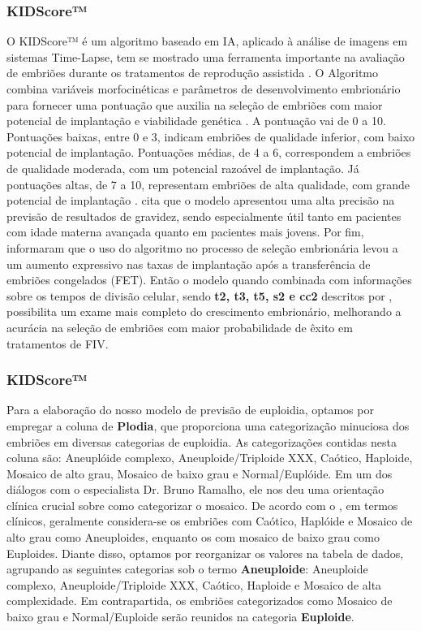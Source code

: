 \subsubsection{KIDScore™}
O KIDScore™ é um algoritmo baseado em IA, aplicado à análise de imagens em sistemas Time-Lapse, tem se mostrado uma ferramenta importante na avaliação de embriões durante os tratamentos de reprodução assistida \cite{kato2021}. O Algoritmo combina variáveis morfocinéticas e parâmetros de desenvolvimento embrionário para fornecer uma pontuação que auxilia na seleção de embriões com maior potencial de implantação e viabilidade genética \cite{gazzo2020}. A pontuação vai de 0 a 10. Pontuações baixas, entre 0 e 3, indicam embriões de qualidade inferior, com baixo potencial de implantação. Pontuações médias, de 4 a 6, correspondem a embriões de qualidade moderada, com um potencial razoável de implantação. Já pontuações altas, de 7 a 10, representam embriões de alta qualidade, com grande potencial de implantação \cite{gazzo2020}.  cita que o modelo apresentou uma alta precisão na previsão de resultados de gravidez, sendo especialmente útil tanto em pacientes com idade materna avançada quanto em pacientes mais jovens. Por fim,  informaram que o uso do algoritmo no processo de seleção embrionária levou a um aumento expressivo nas taxas de implantação após a transferência de embriões congelados (FET). Então o modelo quando combinada com informações sobre os tempos de divisão celular, sendo \textbf{t2, t3, t5, s2 e cc2} descritos por , possibilita um exame mais completo do crescimento embrionário, melhorando a acurácia na seleção de embriões com maior probabilidade de êxito em tratamentos de FIV. 

\subsubsection{KIDScore™}
Para a elaboração do nosso modelo de previsão de euploidia, optamos por empregar a coluna de \textbf{Plodia}, que proporciona uma categorização minuciosa dos embriões em diversas categorias de euploidia. As categorizações contidas nesta coluna são: Aneuplóide complexo, Aneuploide/Triploide XXX, Caótico, Haploide, Mosaico de alto grau, Mosaico de baixo grau e Normal/Euplóide. Em um dos diálogos com o especialista Dr. Bruno Ramalho, ele nos deu uma orientação clínica crucial sobre como categorizar o mosaico. De acordo com o , em termos clínicos, geralmente considera-se os embriões com Caótico, Haplóide e Mosaico de alto grau como Aneuploides, enquanto os com mosaico de baixo grau como Euploides. Diante disso, optamos por reorganizar os valores na tabela de dados, agrupando as seguintes categorias sob o termo \textbf{Aneuploide}: Aneuploide complexo, Aneuploide/Triploide XXX, Caótico, Haploide e Mosaico de alta complexidade. Em contrapartida, os embriões categorizados como Mosaico de baixo grau e Normal/Euploide serão reunidos na categoria \textbf{Euploide}.

